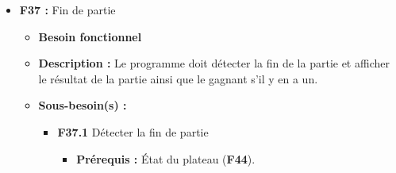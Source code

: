 \documentclass{article}
\begin{document}
\begin{itemize}
\begin{itemize}
\begin{itemize}
\begin{itemize}
                \item \textbf{Description :} Le programme peut récupérer les commandes écrites par l’utilisateur.
                \item \textbf{Actions :} Implémenter une fonction read\_user\_input qui lit l’entrée standard et, selon l’entrée, appelle la fonction appropriée. Par défaut, envoyer un message d’erreur “wrong input” et afficher l’aide avant de redemander une entrée à l’utilisateur.
                \item \textbf{Tests :} Vérifier que la fonction affiche les bons messages avec une entrée incorrecte.
            \end{itemize}
            \smallskip
            \item \textbf{F26.2 :} Obtenir l’accord du joueur
            \begin{itemize}
                \item \textbf{Description :} Certaines interactions nécessitent une réponse par oui ou par non du joueur.
                \item \textbf{Actions :} une fonction booléenne confirm affiche un message passé en paramètre puis affiche la question “yes or no ? (y/n)”, lit l’entrée standard et renvoie True si elle lit ‘y’ ou ‘o’, False si elle lit ‘n’ ou envoie le message “respond by typing ‘y’ or ‘n’” sinon.
                \item \textbf{Tests :} Vérifier les messages en lisant la sortie standard et la valeur de retour de la fonction avec ‘y’, ‘o’, ‘n’ et une entrée quelconque.
            \end{itemize}
        \end{itemize}
    \end{itemize}
\bigskip
    \item \textbf{F37 :} Fin de partie
    \begin{itemize}
        \item \textbf{Besoin fonctionnel}
        \item \textbf{Description :} Le programme doit détecter la fin de la partie et afficher le résultat de la partie ainsi que le gagnant s’il y en a un.
        \item \textbf{Sous-besoin(s) :}
        \begin{itemize}
            \smallskip
            \item \textbf{F37.1} Détecter la fin de partie
            \begin{itemize}
                \item \textbf{Prérequis :} État du plateau (\textbf{F44}). 

\end{itemize}
\end{itemize}
\end{itemize}
\end{itemize}
\end{document}
